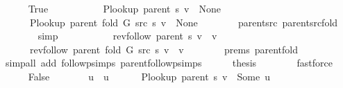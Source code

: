\begin{isabellebody}
\ \ \ \ \isamarkupfalse%
\ True\isanewline
\ \ \ \ \isamarkupfalse%
\isanewline
\ \ \ \ \ \ {\isachardoublequoteopen}P{\isacharunderscore}{\kern0pt}lookup\ {\isacharparenleft}{\kern0pt}parent\ s{\isacharparenright}{\kern0pt}\ v\ {\isacharequal}{\kern0pt}\ None{\isachardoublequoteclose}\isanewline
\ \ \ \ \ \ {\isachardoublequoteopen}P{\isacharunderscore}{\kern0pt}lookup\ {\isacharparenleft}{\kern0pt}parent\ {\isacharparenleft}{\kern0pt}fold\ G\ src\ s{\isacharparenright}{\kern0pt}{\isacharparenright}{\kern0pt}\ v\ {\isacharequal}{\kern0pt}\ None{\isachardoublequoteclose}\isanewline
\ \ \ \ \ \ \isamarkupfalse%
\ parent{\isacharunderscore}{\kern0pt}src\ parent{\isacharunderscore}{\kern0pt}src{\isacharunderscore}{\kern0pt}fold\isanewline
\ \ \ \ \ \ \isamarkupfalse%
\ simp{\isacharplus}{\kern0pt}\isanewline
\ \ \ \ \isamarkupfalse%
\isanewline
\ \ \ \ \ \ {\isachardoublequoteopen}rev{\isacharunderscore}{\kern0pt}follow\ {\isacharparenleft}{\kern0pt}parent\ s{\isacharparenright}{\kern0pt}\ v\ {\isacharequal}{\kern0pt}\ {\isacharbrackleft}{\kern0pt}v{\isacharbrackright}{\kern0pt}{\isachardoublequoteclose}\isanewline
\ \ \ \ \ \ {\isachardoublequoteopen}rev{\isacharunderscore}{\kern0pt}follow\ {\isacharparenleft}{\kern0pt}parent\ {\isacharparenleft}{\kern0pt}fold\ G\ src\ s{\isacharparenright}{\kern0pt}{\isacharparenright}{\kern0pt}\ v\ {\isacharequal}{\kern0pt}\ {\isacharbrackleft}{\kern0pt}v{\isacharbrackright}{\kern0pt}{\isachardoublequoteclose}\isanewline
\ \ \ \ \ \ \isamarkupfalse%
\ {\isachardoublequoteopen}{}{\isachardot}{\kern0pt}prems{\isachardoublequoteclose}{\isacharparenleft}{\kern0pt}{}{\isacharparenright}{\kern0pt}\ parent{\isacharunderscore}{\kern0pt}fold\isanewline
\ \ \ \ \ \ \isamarkupfalse%
\ {\isacharparenleft}{\kern0pt}simp{\isacharunderscore}{\kern0pt}all\ add{\isacharcolon}{\kern0pt}\ follow{\isacharunderscore}{\kern0pt}psimps\ parent{\isachardot}{\kern0pt}follow{\isacharunderscore}{\kern0pt}psimps{\isacharparenright}{\kern0pt}\isanewline
\ \ \ \ \isamarkupfalse%
\ {\isacharquery}{\kern0pt}thesis\isanewline
\ \ \ \ \ \ \isamarkupfalse%
\ fastforce\isanewline
\ \ \isamarkupfalse%
\isanewline
\ \ \ \ \isamarkupfalse%
\ False\isanewline
\ \ \ \ \isamarkupfalse%
\ \isamarkupfalse%
\ u\ \ u{\isacharcolon}{\kern0pt}\isanewline
\ \ \ \ \ \ {\isachardoublequoteopen}P{\isacharunderscore}{\kern0pt}lookup\ {\isacharparenleft}{\kern0pt}parent\ s{\isacharparenright}{\kern0pt}\ v\ {\isacharequal}{\kern0pt}\ Some\ u{\isachardoublequoteclose}\isanewline

\end{isabellebody}
